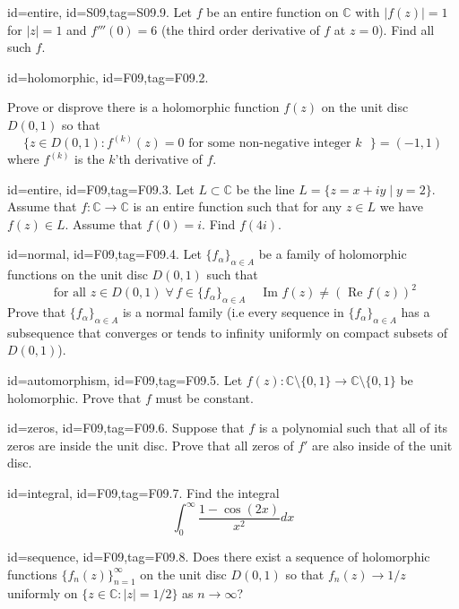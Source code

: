 \documentclass[12pt,letterpaper]{article}
\theoremstyle{plain}
\theoremstyle{definition}
\begin{document}
{\item[id=entire, id=S09,tag=S09.9.]
Let $f$ be an entire function on $\mathbb{C}$ with $| f(z) | = 1$ for $| z | = 1$ and $f'''(0) = 6$ (the third order derivative of $f$ at $z = 0$). Find all such $f$.

\item[id=holomorphic, id=F09,tag=F09.2.]

Prove or disprove there is a holomorphic function $f(z)$ on the unit disc $D(0,1)$ so that
\[
	\{z \in D(0,1) \colon f^{(k)}(z) = 0 \text{ for some non-negative integer $k$ } \} = (-1,1)
\]
where $f^{(k)}$ is the $k$'th derivative of $f$.

\item[id=entire, id=F09,tag=F09.3.]
Let $L \subset \mathbb{C}$ be the line $L = \{z = x + iy \mid y = 2\}$. Assume that $f : \mathbb{C} \rightarrow \mathbb{C}$ is an entire function such that for any $z \in L$ we have $f(z) \in L$. Assume that $f(0) = i$. Find $f(4i)$.

\item[id=normal, id=F09,tag=F09.4.]
Let $\{f_\alpha\}_{\alpha \in A}$ be a family of holomorphic functions on the unit disc $D(0,1)$ such that
\[
	\text{ for all } z \in D(0,1) \; \forall \, f \in \{f_\alpha\}_{\alpha \in A} \quad \text{ Im }f(z) \ne (\text{ Re } f(z))^2
\]
Prove that $\{f_\alpha\}_{\alpha \in A}$ is a normal family (i.e every sequence in $\{f_\alpha\}_{\alpha \in A}$ has a subsequence that converges or tends to infinity uniformly on compact subsets of $D(0,1)$).

\item[id=automorphism, id=F09,tag=F09.5.]
Let $f(z) : \mathbb{C}\setminus\{0,1\} \rightarrow \mathbb{C}\setminus\{0,1\}$ be holomorphic. Prove that $f$ must be constant.

\item[id=zeros, id=F09,tag=F09.6.]
Suppose that $f$ is a polynomial such that all of its zeros are inside the unit disc. Prove that all zeros of $f'$ are also inside of the unit disc.

\item[id=integral, id=F09,tag=F09.7.]
Find the integral
\[
	\int_{0}^{\infty} \frac{1-\cos(2x)}{x^2} dx
\]

\item[id=sequence, id=F09,tag=F09.8.]
Does there exist a sequence of holomorphic functions $\{f_n(z)\}_{n=1}^{\infty}$ on the unit disc $D(0,1)$ so that $f_n(z) \rightarrow 1/z$ uniformly on $\{z \in \mathbb{C} \colon | z | = 1/2\}$ as $n\rightarrow\infty$?

}
\end{document}
